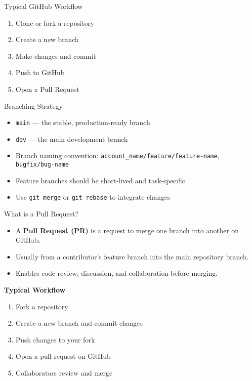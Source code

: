 \documentclass[12pt]{beamer}
\begin{document}
\begin{frame}{Typical GitHub Workflow}
  \begin{enumerate}
    \item Clone or fork a repository
    \item Create a new branch
    \item Make changes and commit
    \item Push to GitHub
    \item Open a Pull Request
  \end{enumerate}
\end{frame}

\begin{frame}{Branching Strategy}
  \begin{itemize}
    \item \texttt{main} — the stable, production-ready branch
    \item \texttt{dev} — the main development branch
    \item Branch naming convention: \texttt{account\_name/feature/feature-name}, \texttt{bugfix/bug-name}
    \item Feature branches should be short-lived and task-specific
    \item Use \texttt{git merge} or \texttt{git rebase} to integrate changes
  \end{itemize}
\end{frame}

\begin{frame}{What is a Pull Request?}
\begin{itemize}
    \item A \textbf{Pull Request (PR)} is a request to merge one branch into another on GitHub.
    \item Usually from a contributor’s feature branch into the main repository branch.
    \item Enables code review, discussion, and collaboration before merging.
\end{itemize}
\vspace{1em}
\textbf{Typical Workflow}
\begin{enumerate}
    \item Fork a repository
    \item Create a new branch and commit changes
    \item Push changes to your fork
    \item Open a pull request on GitHub
    \item Collaborators review and merge
\end{enumerate}
\end{frame}
\end{document}
